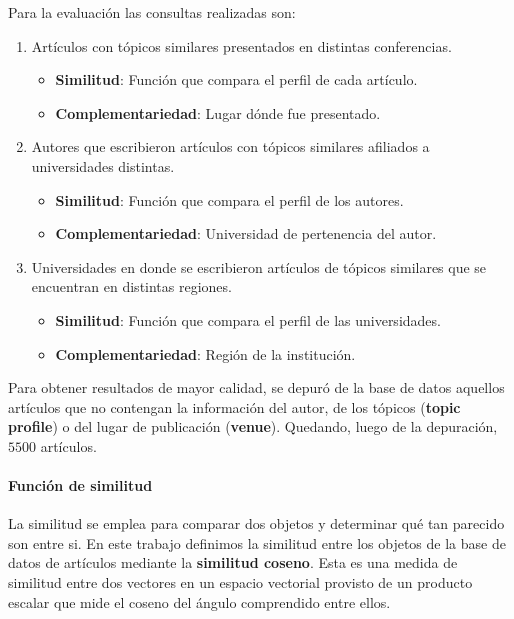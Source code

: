 Para la evaluación las consultas realizadas son:
\begin{enumerate}
	\item
		Artículos con tópicos similares presentados en distintas conferencias.
		\begin{itemize}
			\item \textbf{Similitud}: Función que compara el perfil de cada artículo.
			\item \textbf{Complementariedad}: Lugar dónde fue presentado.
		\end{itemize}

	\item
	Autores que escribieron artículos con tópicos similares afiliados a universidades distintas.
	\begin{itemize}
		\item \textbf{Similitud}: Función que compara el perfil de los autores.
		\item \textbf{Complementariedad}: Universidad de pertenencia del autor.
	\end{itemize}

	\item 
	Universidades en donde se escribieron artículos de tópicos similares que se encuentran en distintas regiones. 
	\begin{itemize}
		\item \textbf{Similitud}: Función que compara el perfil de las universidades.
		\item \textbf{Complementariedad}: Región de la institución.
	\end{itemize}
\end {enumerate}

Para obtener resultados de mayor calidad, se depuró de la base de datos aquellos artículos que no contengan la información del autor, de los tópicos (\textbf{topic profile}) o del lugar de publicación (\textbf{venue}). Quedando, luego de la depuración, $5500$ artículos.  

\paragraph{Función de similitud}
La similitud se emplea para comparar dos objetos y determinar qué tan parecido son entre si. En este trabajo definimos la similitud entre los objetos de la base de datos de artículos mediante la \textbf{similitud coseno}. Esta es una medida de similitud entre dos vectores en un espacio vectorial provisto de un producto escalar que mide el coseno del ángulo comprendido entre ellos.

